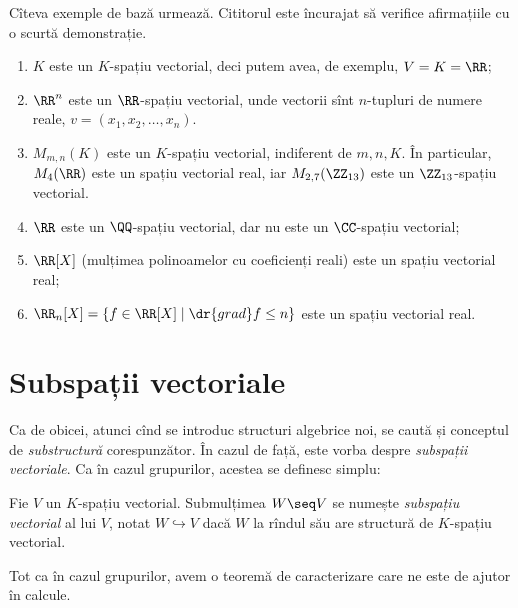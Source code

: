 Cîteva exemple de bază urmează. Cititorul este încurajat să verifice afirmațiile cu o scurtă
demonstrație.
\begin{enumerate}
    \item $ K $ este un $ K $-spațiu vectorial, deci putem avea, de exemplu, $ V = K = \RR $;
    \item $ \RR^n $ este un $ \RR $-spațiu vectorial, unde vectorii sînt $ n $-tupluri
        de numere reale, $ v = (x_1, x_2, \dots, x_n) $.
    \item $ M_{m, n}(K) $ este un $ K $-spațiu vectorial, indiferent de $ m, n, K $. În particular,
        $ M_4(\RR) $ este un spațiu vectorial real, iar $ M_{2, 7}(\ZZ_{13}) $ este un
        $ \ZZ_{13} $-spațiu vectorial.
    \item $ \RR $ este un $ \QQ $-spațiu vectorial, dar nu este un $ \CC $-spațiu vectorial;
    \item $ \RR[X] $ (mulțimea polinoamelor cu coeficienți reali) este un spațiu vectorial real;
    \item $ \RR_n[X] = \{ f \in \RR[X] \mid \dr{grad}f \leq n \} $ este un spațiu vectorial
        real.
\end{enumerate}


\section{Subspații vectoriale}

Ca de obicei, atunci cînd se introduc structuri algebrice noi, se caută
și conceptul de \emph{substructură} corespunzător. În cazul de față, este vorba
despre \emph{subspații vectoriale}. Ca în cazul grupurilor, acestea
se definesc simplu:

\begin{definition}\label{def:subspatii}
    Fie $ V $ un $ K $-spațiu vectorial. Submulțimea $ W \seq V $ se numește
    \emph{subspațiu vectorial} al lui $ V $, notat $ W \hookrightarrow V $ dacă $ W $
    la rîndul său are structură de $ K $-spațiu vectorial.
\end{definition}

Tot ca în cazul grupurilor, avem o teoremă de caracterizare care ne este
de ajutor în calcule.


